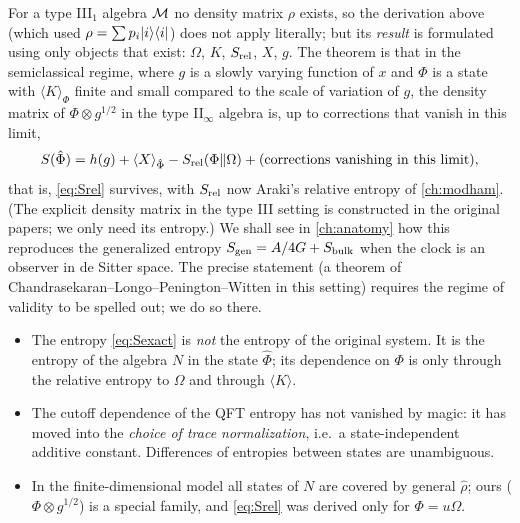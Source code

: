 For a type III$_1$ algebra $\mathcal{M}$ no density matrix $\rho$ exists, so the derivation above (which used $\rho=\sum p_i\lvert i\rangle\langle i\rvert$) does not apply literally; but its \emph{result} is formulated using only objects that exist: $\Omega$, $K$, $S_{\rm rel}$, $X$, $g$. The theorem is that in the semiclassical regime, where $g$ is a slowly varying function of $x$ and $\Phi$ is a state with $\langle K\rangle_\Phi$ finite and small compared to the scale of variation of $g$, the density matrix of $\Phi\otimes g^{1/2}$ in the type II$_\infty$ algebra is, up to corrections that vanish in this limit,
\begin{equation}
S(\hat\Phi)=h(g)+\langle X\rangle_{\hat\Phi}-S_{\rm rel}(\Phi\|\Omega)+(\text{corrections vanishing in this limit}),
\end{equation}
that is, \eqref{eq:Srel} survives, with $S_{\rm rel}$ now Araki's relative entropy of \cref{ch:modham}. (The explicit density matrix in the type III setting is constructed in the original papers; we only need its entropy.) We shall see in \cref{ch:anatomy} how this reproduces the generalized entropy $S_{\mathrm{gen}}=A/4G+S_{\rm bulk}$ when the clock is an observer in de Sitter space. The precise statement (a theorem of Chandrasekaran--Longo--Penington--Witten in this setting) requires the regime of validity to be spelled out; we do so there.

\begin{whatwrong}
\begin{itemize}
\item The entropy \eqref{eq:Sexact} is \emph{not} the entropy of the original system. It is the entropy of the algebra $N$ in the state $\hat\Phi$; its dependence on $\Phi$ is only through the relative entropy to $\Omega$ and through $\langle K\rangle$.
\item The cutoff dependence of the QFT entropy has not vanished by magic: it has moved into the \emph{choice of trace normalization}, i.e.\ a state-independent additive constant. Differences of entropies between states are unambiguous.
\item In the finite-dimensional model all states of $N$ are covered by general $\hat\rho$; ours ($\Phi\otimes g^{1/2}$) is a special family, and \eqref{eq:Srel} was derived only for $\Phi=u\Omega$.
\end{itemize}
\end{whatwrong}

